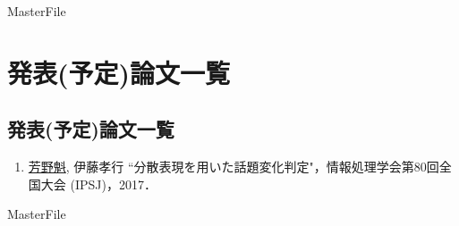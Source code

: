 \expandafter\ifx\csname MasterFile\endcsname\relax
\def\SubFile{hoge}


\fi

\cleardoublepage
\chapter{発表(予定)論文一覧}

\section{発表(予定)論文一覧}
\begin{enumerate}
\item \underline{芳野魁}, 伊藤孝行 ``分散表現を用いた話題変化判定"，情報処理学会第80回全国大会 (IPSJ)，2017．
\end{enumerate}


\clearpage
\expandafter\ifx\csname MasterFile\endcsname\relax

\fi
